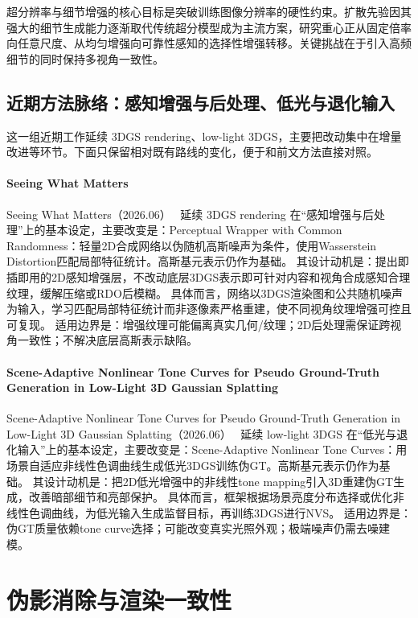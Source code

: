\begin{takeaway}
超分辨率与细节增强的核心目标是突破训练图像分辨率的硬性约束。扩散先验因其强大的细节生成能力逐渐取代传统超分模型成为主流方案，研究重心正从固定倍率向任意尺度、从均匀增强向可靠性感知的选择性增强转移。关键挑战在于引入高频细节的同时保持多视角一致性。
\end{takeaway}

\subsection{近期方法脉络：感知增强与后处理、低光与退化输入}

这一组近期工作延续 3DGS rendering、low-light 3DGS，主要把改动集中在增量改进等环节。下面只保留相对既有路线的变化，便于和前文方法直接对照。

\paragraph{Seeing What Matters}
Seeing What Matters（2026.06）~\cite{2606_11782} 延续 3DGS rendering 在“感知增强与后处理”上的基本设定，主要改变是：Perceptual Wrapper with Common Randomness：轻量2D合成网络以伪随机高斯噪声为条件，使用Wasserstein Distortion匹配局部特征统计。高斯基元表示仍作为基础。
其设计动机是：提出即插即用的2D感知增强层，不改动底层3DGS表示即可针对内容和视角合成感知合理纹理，缓解压缩或RDO后模糊。
具体而言，网络以3DGS渲染图和公共随机噪声为输入，学习匹配局部特征统计而非逐像素严格重建，使不同视角纹理增强可控且可复现。
适用边界是：增强纹理可能偏离真实几何/纹理；2D后处理需保证跨视角一致性；不解决底层高斯表示缺陷。

\paragraph{Scene-Adaptive Nonlinear Tone Curves for Pseudo Ground-Truth Generation in Low-Light 3D Gaussian Splatting}
Scene-Adaptive Nonlinear Tone Curves for Pseudo Ground-Truth Generation in Low-Light 3D Gaussian Splatting（2026.06）~\cite{2606_11841} 延续 low-light 3DGS 在“低光与退化输入”上的基本设定，主要改变是：Scene-Adaptive Nonlinear Tone Curves：用场景自适应非线性色调曲线生成低光3DGS训练伪GT。高斯基元表示仍作为基础。
其设计动机是：把2D低光增强中的非线性tone mapping引入3D重建伪GT生成，改善暗部细节和亮部保护。
具体而言，框架根据场景亮度分布选择或优化非线性色调曲线，为低光输入生成监督目标，再训练3DGS进行NVS。
适用边界是：伪GT质量依赖tone curve选择；可能改变真实光照外观；极端噪声仍需去噪建模。
\section{伪影消除与渲染一致性}
\label{sec:02_9}

